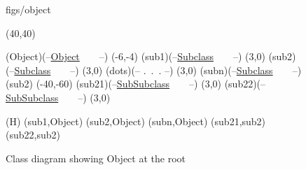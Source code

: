 






\begin {figure}


\Draw

 {figs/object}

\MinNodeSize(40,40)

\RectNode (Object)(--\underline {Object}~~~~--)
\MoveToExit(-6,-4)
\RectNode (sub1)(--\underline {Subclass}~~~~--)
\MoveToExit(3,0)
\RectNode (sub2)(--\underline {Subclass}~~~~--)
\MoveToExit(3,0)
\Node (dots)(-- .~.~. --)
\MoveToExit(3,0)
\RectNode (subn)(--\underline {Subclass}~~~~--)
\MoveToLoc(sub2)
\Move(-40,-60)
\RectNode (sub21)(--\underline {SubSubclass}~~~~--)
\MoveToExit(3,0)
\RectNode (sub22)(--\underline {SubSubclass}~~~~--)
\MoveToExit(3,0)

\ArrowSpec (H)
\Edge(sub1,Object)
\Edge(sub2,Object)
\Edge(subn,Object)
\Edge(sub21,sub2)
\Edge(sub22,sub2)

\EndDraw

\caption {Class diagram showing Object at the root}


\label {fig:classHierarchy}

\end {figure}



